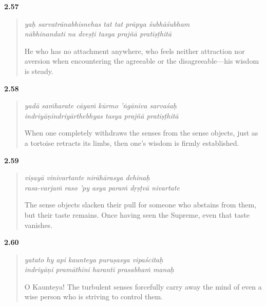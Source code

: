 \par\noindent\textbf{2.57}\par
\begin{verse}
\textit{yaḥ sarvatrānabhisnehas tat tat prāpya śubhāśubham} \\
\textit{nābhinandati na dveṣṭi tasya prajñā pratiṣṭhitā}

\noindent He who has no attachment anywhere, who feels neither attraction nor aversion when encountering the agreeable or the disagreeable---his wisdom is steady.
\end{verse}
\par



\par\noindent\textbf{2.58}\par
\begin{verse}
\textit{yadā saṁharate cāyaṁ kūrmo ’ṅgānīva sarvaśaḥ} \\
\textit{indriyāṇīndriyārthebhyas tasya prajñā pratiṣṭhitā}

\noindent When one completely withdraws the senses from the sense objects, just as a tortoise retracts its limbs, then one's wisdom is firmly established.
\end{verse}
\par



\par\noindent\textbf{2.59}\par
\begin{verse}
\textit{viṣayā vinivartante nirāhārasya dehinaḥ} \\
\textit{rasa-varjaṁ raso ’py asya paraṁ dṛṣṭvā nivartate}

\noindent The sense objects slacken their pull for someone who abstains from them, but their taste remains. Once having seen the Supreme, even that taste vanishes.
\end{verse}
\par



\par\noindent\textbf{2.60}\par
\begin{verse}
\textit{yatato hy api kaunteya puruṣasya vipaścitaḥ} \\
\textit{indriyāṇi pramāthīni haranti prasabhaṁ manaḥ}

\noindent O Kaunteya! The turbulent senses forcefully carry away the mind of even a wise person who is striving to control them.
\end{verse}
\par



